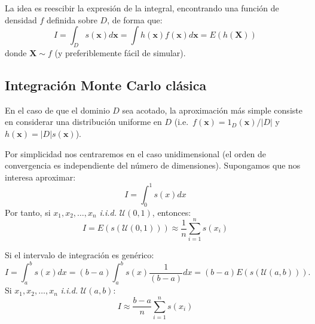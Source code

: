 \documentclass[
  spanish,
  10pt,
]{book}
\renewcommand{\mathbf}[1]{\symbf{#1}}
\theoremstyle{break}
\theoremstyle{nonumberplain}
\begin{document}
La idea es reescibir la expresión de la integral, encontrando una función de densidad \(f\) definida sobre \(D\), de forma que:
\[I = \int _D s(\mathbf{x}) d \mathbf{x} = \int h(\mathbf{x})f(\mathbf{x}) d \mathbf{x} = E\left( h(\mathbf{X}) \right)\]
donde \(\mathbf{X} \sim f\) (y preferiblemente fácil de simular).

\subsection{Integración Monte Carlo clásica}\label{integraciuxf3n-monte-carlo-cluxe1sica}

En el caso de que el dominio \(D\) sea acotado, la aproximación más simple consiste en considerar una distribución uniforme en \(D\) (i.e.~\(f(\mathbf{x})=1_D(\mathbf{x})/|D|\) y \(h(\mathbf{x}) = |D|s(\mathbf{x})\)).

Por simplicidad nos centraremos en el caso unidimensional (el orden de convergencia es independiente del número de dimensiones).
Supongamos que nos interesa aproximar:
\[I = \int_0^1 s(x) dx\]
Por tanto, si \(x_1,x_2,\ldots ,x_n\) \emph{i.i.d.} \(\mathcal{U}(0, 1)\), entonces:
\[I = E\left( s\left( \mathcal{U}(0, 1) \right) \right)
\approx \frac{1}{n}\sum\limits_{i=1}^n s\left( x_i\right)\]

Si el intervalo de integración es genérico:
\[I = \int_a^b s(x) dx = 
(b-a)\int_a^b s(x) \frac1{(b-a)}dx = 
(b-a)E\left( s\left( \mathcal{U}(a, b) \right) \right).\]
Si \(x_1,x_2,\ldots ,x_n\) \emph{i.i.d.} \(\mathcal{U}(a, b)\):
\[I \approx \frac{b-a}{n}\sum\limits_{i=1}^n s\left( x_i\right)\]
\end{document}
